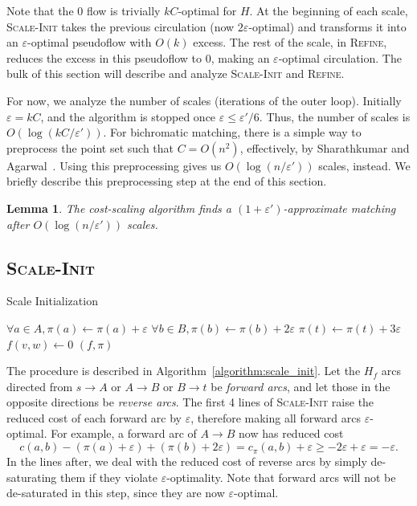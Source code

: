 \documentclass[11pt]{article}
\def\eps{\varepsilon}
\theoremstyle{plain}
\newtheorem{lemma}{Lemma}
\begin{document}
Note that the 0 flow is trivially $kC$-optimal for $H$.
At the beginning of each scale, \textsc{Scale-Init} takes the previous
circulation (now $2\eps$-optimal) and transforms it into an $\eps$-optimal
pseudoflow with $O(k)$ excess.
The rest of the scale, in \textsc{Refine}, reduces the excess in this
pseudoflow to 0, making an $\eps$-optimal circulation.
The bulk of this section will describe and analyze \textsc{Scale-Init} and
\textsc{Refine}.

For now, we analyze the number of scales (iterations of the outer loop).
Initially $\eps = kC$, and the algorithm is stopped once $\eps \leq \eps'/6$.
Thus, the number of scales is $O(\log(kC/\eps'))$.
For bichromatic matching, there is a simple way to preprocess the point set
such that $C = O(n^2)$, effectively, by Sharathkumar and Agarwal~\cite{SA12}.
Using this preprocessing gives us $O(\log(n/\eps'))$ scales, instead.
We briefly describe this preprocessing step at the end of this section.

\begin{lemma}
\label{lemma:goldberg_scales}
	The cost-scaling algorithm finds a $(1 + \eps')$-approximate matching
	after $O(\log(n/\eps'))$ scales.
\end{lemma}

\subsection{\textsc{Scale-Init}}

\begin{algorithm}
\caption{Scale Initialization}
\label{algorithm:scale_init}
\begin{algorithmic}[1]
	\State $\forall a \in A, \pi(a) \gets \pi(a) + \eps$
	\State $\forall b \in B, \pi(b) \gets \pi(b) + 2\eps$
	\State $\pi(t) \gets \pi(t) + 3\eps$
	\Statex %
		\If{$c_\pi(w, v) < -\eps$}
			\State $f(v, w) \gets 0$
		\EndIf
	\EndFor
	\State\Return $(f, \pi)$
\EndFunction
\end{algorithmic}
\end{algorithm}

The procedure is described in Algorithm~\ref{algorithm:scale_init}.
Let the $H_f$ arcs directed from $s \to A$ or $A \to B$ or $B \to t$ be
\emph{forward arcs}, and let those in the opposite directions be
\emph{reverse arcs}.
The first 4 lines of \textsc{Scale-Init} raise the reduced cost of each
forward arc by $\eps$, therefore making all forward arcs $\eps$-optimal.
For example, a forward arc of $A \to B$ now has reduced cost
\begin{equation*}
	c(a, b) - (\pi(a) + \eps) + (\pi(b) + 2\eps)
	= c_\pi(a, b) + \eps
	\geq -2\eps + \eps
	= -\eps.
\end{equation*}
In the lines after, we deal with the reduced cost of reverse arcs by simply
de-saturating them if they violate $\eps$-optimality.
Note that forward arcs will not be de-saturated in this step, since they are
now $\eps$-optimal.
\end{document}
